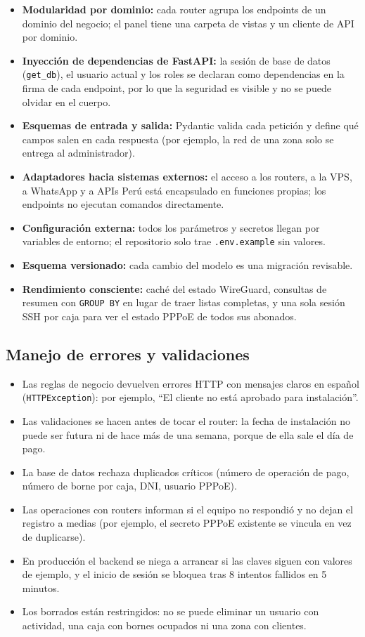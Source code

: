 \begin{itemize}
  \item \textbf{Modularidad por dominio:} cada router agrupa los endpoints de un dominio del
  negocio; el panel tiene una carpeta de vistas y un cliente de API por dominio.
  \item \textbf{Inyección de dependencias de FastAPI:} la sesión de base de datos
  (\texttt{get\_db}), el usuario actual y los roles se declaran como dependencias en la firma
  de cada endpoint, por lo que la seguridad es visible y no se puede olvidar en el cuerpo.
  \item \textbf{Esquemas de entrada y salida:} Pydantic valida cada petición y define qué
  campos salen en cada respuesta (por ejemplo, la red de una zona solo se entrega al
  administrador).
  \item \textbf{Adaptadores hacia sistemas externos:} el acceso a los routers, a la VPS, a
  WhatsApp y a APIs Perú está encapsulado en funciones propias; los endpoints no ejecutan
  comandos directamente.
  \item \textbf{Configuración externa:} todos los parámetros y secretos llegan por variables de
  entorno; el repositorio solo trae \texttt{.env.example} sin valores.
  \item \textbf{Esquema versionado:} cada cambio del modelo es una migración revisable.
  \item \textbf{Rendimiento consciente:} caché del estado WireGuard, consultas de resumen con
  \texttt{GROUP BY} en lugar de traer listas completas, y una sola sesión SSH por caja para ver
  el estado PPPoE de todos sus abonados.
\end{itemize}

\subsection{Manejo de errores y validaciones}

\begin{itemize}
  \item Las reglas de negocio devuelven errores HTTP con mensajes claros en español
  (\texttt{HTTPException}): por ejemplo, ``El cliente no está aprobado para instalación''.
  \item Las validaciones se hacen antes de tocar el router: la fecha de instalación no puede
  ser futura ni de hace más de una semana, porque de ella sale el día de pago.
  \item La base de datos rechaza duplicados críticos (número de operación de pago, número de
  borne por caja, DNI, usuario PPPoE).
  \item Las operaciones con routers informan si el equipo no respondió y no dejan el registro a
  medias (por ejemplo, el secreto PPPoE existente se vincula en vez de duplicarse).
  \item En producción el backend se niega a arrancar si las claves siguen con valores de
  ejemplo, y el inicio de sesión se bloquea tras 8 intentos fallidos en 5 minutos.
  \item Los borrados están restringidos: no se puede eliminar un usuario con actividad, una
  caja con bornes ocupados ni una zona con clientes.
\end{itemize}

